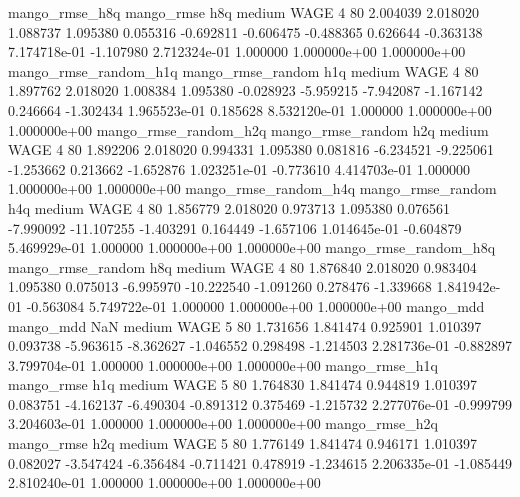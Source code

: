        mango_rmse_h8q        mango_rmse                  h8q     medium     WAGE                 4 80  2.004039       2.018020 1.088737       1.095380    0.055316     -0.692811     -0.606475    -0.488365       0.626644 -0.363138 7.174718e-01    -1.107980   2.712324e-01            1.000000    1.000000e+00        1.000000e+00
mango_rmse_random_h1q mango_rmse_random                  h1q     medium     WAGE                 4 80  1.897762       2.018020 1.008384       1.095380   -0.028923     -5.959215     -7.942087    -1.167142       0.246664 -1.302434 1.965523e-01     0.185628   8.532120e-01            1.000000    1.000000e+00        1.000000e+00
mango_rmse_random_h2q mango_rmse_random                  h2q     medium     WAGE                 4 80  1.892206       2.018020 0.994331       1.095380    0.081816     -6.234521     -9.225061    -1.253662       0.213662 -1.652876 1.023251e-01    -0.773610   4.414703e-01            1.000000    1.000000e+00        1.000000e+00
mango_rmse_random_h4q mango_rmse_random                  h4q     medium     WAGE                 4 80  1.856779       2.018020 0.973713       1.095380    0.076561     -7.990092    -11.107255    -1.403291       0.164449 -1.657106 1.014645e-01    -0.604879   5.469929e-01            1.000000    1.000000e+00        1.000000e+00
mango_rmse_random_h8q mango_rmse_random                  h8q     medium     WAGE                 4 80  1.876840       2.018020 0.983404       1.095380    0.075013     -6.995970    -10.222540    -1.091260       0.278476 -1.339668 1.841942e-01    -0.563084   5.749722e-01            1.000000    1.000000e+00        1.000000e+00
            mango_mdd         mango_mdd                  NaN     medium     WAGE                 5 80  1.731656       1.841474 0.925901       1.010397    0.093738     -5.963615     -8.362627    -1.046552       0.298498 -1.214503 2.281736e-01    -0.882897   3.799704e-01            1.000000    1.000000e+00        1.000000e+00
       mango_rmse_h1q        mango_rmse                  h1q     medium     WAGE                 5 80  1.764830       1.841474 0.944819       1.010397    0.083751     -4.162137     -6.490304    -0.891312       0.375469 -1.215732 2.277076e-01    -0.999799   3.204603e-01            1.000000    1.000000e+00        1.000000e+00
       mango_rmse_h2q        mango_rmse                  h2q     medium     WAGE                 5 80  1.776149       1.841474 0.946171       1.010397    0.082027     -3.547424     -6.356484    -0.711421       0.478919 -1.234615 2.206335e-01    -1.085449   2.810240e-01            1.000000    1.000000e+00        1.000000e+00
